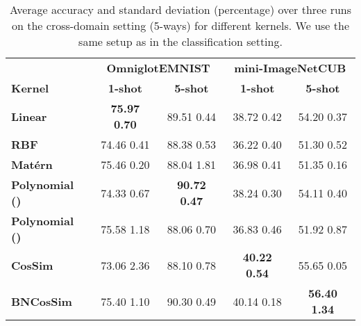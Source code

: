 \documentclass{article}
\begin{document}
\begin{table}[H]
\caption{Average accuracy and standard deviation (percentage) over three runs on the cross-domain setting (5-ways) for different kernels. We use the same setup as in the classification setting.}
\centering
\begin{tabular}{lcccc}
\hline
\textbf{} & \multicolumn{2}{c}{\textbf{Omniglot}\textbf{EMNIST}} & \multicolumn{2}{c}{\textbf{mini-ImageNet}\textbf{CUB}} \\
\small{\textbf{Kernel}} & \textbf{1-shot}& \textbf{5-shot} & \textbf{1-shot} & \textbf{5-shot} \\ 
\hline
\small{\textbf{Linear}} & \textbf{75.97  \small{0.70}} & 89.51  \small{0.44} & 38.72  \small{0.42} & 54.20  \small{0.37}\\
\small{\textbf{RBF}} & 74.46  \small{0.41} & 88.38  \small{0.53} & 36.22  \small{0.40} & 51.30  \small{0.52} \\
\small{\textbf{Mat\'ern}} & 75.46  \small{0.20} & 88.04  \small{1.81} & 36.98  \small{0.41} & 51.35  \small{0.16} \\
\small{\textbf{Polynomial ()}} & 74.33  \small{0.67} & \textbf{90.72  \small{0.47}} & 38.24  \small{0.30} &  54.11  \small{0.40} \\
\small{\textbf{Polynomial ()}} & 75.58  \small{1.18} & 88.06  \small{0.70} & 36.83  \small{0.46} &  51.92  \small{0.87} \\
\small{\textbf{CosSim}} & 73.06  \small{2.36} & 88.10  \small{0.78} & \textbf{40.22  \small{0.54}} & 55.65  \small{0.05} \\
\small{\textbf{BNCosSim}} & 75.40  \small{1.10} & 90.30  \small{0.49} & 40.14  \small{0.18} & \textbf{56.40  \small{1.34}} \\
\hline
\end{tabular}
\label{tab_crossdomain_kernel_comparison}
\end{table}
\end{document}
